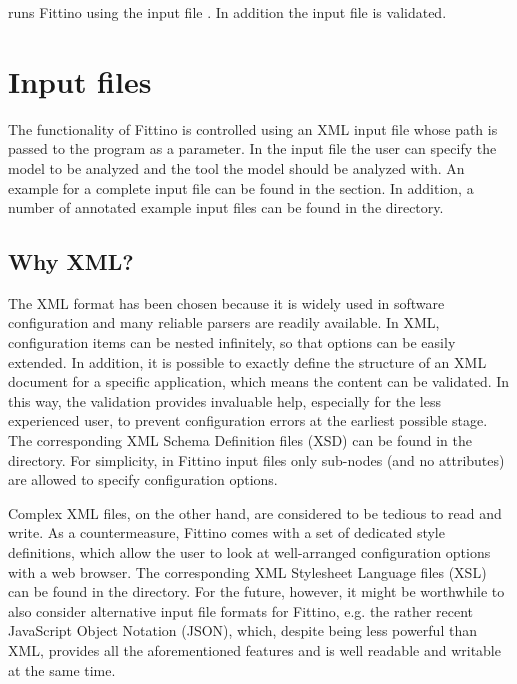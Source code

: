 \documentclass[letterpaper,10pt,english]{sphinxmanual}
\begin{document}
runs Fittino using the input file . In addition the input
file is validated.


\section{Input files}
\label{input_files::doc}\label{input_files:input-files}\label{input_files:id1}
The functionality of Fittino is controlled using an XML input file whose path is passed to the
program as a parameter. In the input file the user can specify the model to be analyzed and the tool
the model should be analyzed with. An example for a complete input file can be found in the
{\hyperref[getting_started:getting-started]{\emph{}}} section. In addition, a number of annotated example input files can be found
in the  directory.


\subsection{Why XML?}
\label{why_xml::doc}\label{why_xml:why-xml}
The XML format has been chosen because it is widely used in software configuration and many reliable
parsers are readily available. In XML, configuration items can be nested infinitely, so that options
can be easily extended. In addition, it is possible to exactly define the structure of an XML
document for a specific application, which means the content can be validated. In this way, the
validation provides invaluable help, especially for the less experienced user, to prevent
configuration errors at the earliest possible stage. The corresponding XML Schema Definition files
(XSD) can be found in the  directory. For simplicity, in Fittino input files
only sub-nodes (and no attributes) are allowed to specify configuration options.

Complex XML files, on the other hand, are considered to be tedious to read and write. As a
countermeasure, Fittino comes with a set of dedicated style definitions, which allow the user to
look at well-arranged configuration options with a web browser. The corresponding XML Stylesheet
Language files (XSL) can be found in the  directory. For the future, however, it
might be worthwhile to also consider alternative input file formats for Fittino, e.g. the rather
recent JavaScript Object Notation (JSON), which, despite being less powerful than XML, provides all
the aforementioned features and is well readable and writable at the same time.
\end{document}
